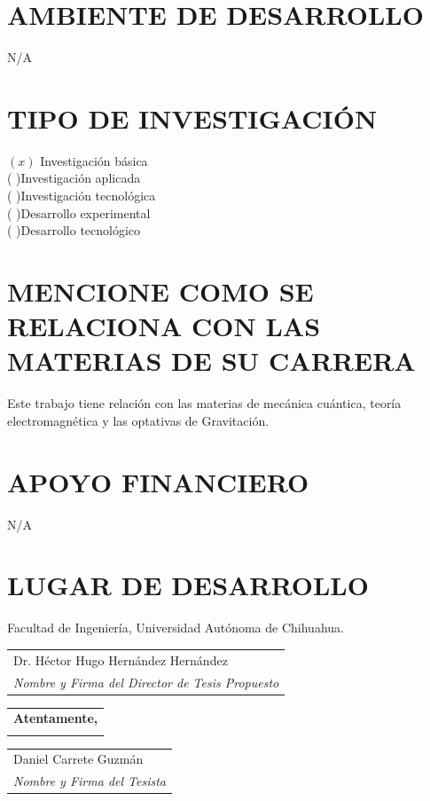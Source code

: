 \documentclass[a4paper,12pt]{article}
\begin{document}
\section*{AMBIENTE DE DESARROLLO}
N/A\\
\section*{TIPO DE INVESTIGACIÓN}
$(x)$ Investigación básica\\
( )Investigación aplicada\\
( )Investigación tecnológica\\
( )Desarrollo experimental\\
( )Desarrollo tecnológico

\section*{MENCIONE COMO SE RELACIONA CON LAS MATERIAS DE SU CARRERA}
Este trabajo tiene relación con las materias de  mecánica cuántica, teoría electromagnética y las optativas de Gravitación.

\section*{APOYO FINANCIERO}
N/A

\section*{LUGAR DE DESARROLLO}
Facultad de Ingeniería, Universidad Autónoma de Chihuahua.



\vspace{2cm}
\begin{center}
    \begin{tabular}{p{10cm}}
        \hline
        \centering Dr. Héctor Hugo Hernández Hernández \tabularnewline
        \centering \textit{Nombre y Firma del Director de Tesis Propuesto}\tabularnewline
    \end{tabular}
    \begin{tabular}{p{10cm}}
    \vspace{2cm}
    \textbf{Atentamente,}\\ 
    \vspace{2.4cm}
\end{tabular}
    \begin{tabular}{p{10cm}}
        \hline
        \centering Daniel Carrete Guzmán \tabularnewline
        \centering \textit{Nombre y Firma del Tesista} \tabularnewline
    \end{tabular}
\end{center}

\newpage

\printbibliography
\nocite{*}
\end{document}
